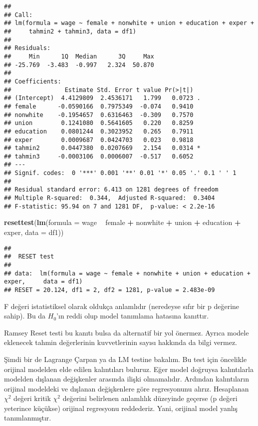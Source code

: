\documentclass[
]{book}
\newenvironment{Shaded}{\begin{snugshade}}{\end{snugshade}}
\newcommand{\DataTypeTok}[1]{\textcolor[rgb]{0.13,0.29,0.53}{#1}}
\newcommand{\KeywordTok}[1]{\textcolor[rgb]{0.13,0.29,0.53}{\textbf{#1}}}
\newcommand{\NormalTok}[1]{#1}
\newcommand{\OperatorTok}[1]{\textcolor[rgb]{0.81,0.36,0.00}{\textbf{#1}}}
\newcommand{\StringTok}[1]{\textcolor[rgb]{0.31,0.60,0.02}{#1}}
\begin{document}
\begin{verbatim}
## 
## Call:
## lm(formula = wage ~ female + nonwhite + union + education + exper + 
##     tahmin2 + tahmin3, data = df1)
## 
## Residuals:
##     Min      1Q  Median      3Q     Max 
## -25.769  -3.483  -0.997   2.324  50.870 
## 
## Coefficients:
##               Estimate Std. Error t value Pr(>|t|)  
## (Intercept)  4.4129809  2.4536171   1.799   0.0723 .
## female      -0.0590166  0.7975349  -0.074   0.9410  
## nonwhite    -0.1954657  0.6316463  -0.309   0.7570  
## union        0.1241080  0.5641605   0.220   0.8259  
## education    0.0801244  0.3023952   0.265   0.7911  
## exper        0.0009687  0.0424703   0.023   0.9818  
## tahmin2      0.0447380  0.0207669   2.154   0.0314 *
## tahmin3     -0.0003106  0.0006007  -0.517   0.6052  
## ---
## Signif. codes:  0 '***' 0.001 '**' 0.01 '*' 0.05 '.' 0.1 ' ' 1
## 
## Residual standard error: 6.413 on 1281 degrees of freedom
## Multiple R-squared:  0.344,  Adjusted R-squared:  0.3404 
## F-statistic: 95.94 on 7 and 1281 DF,  p-value: < 2.2e-16
\end{verbatim}

\begin{Shaded}
\begin{Highlighting}[]
\KeywordTok{resettest}\NormalTok{(}\KeywordTok{lm}\NormalTok{(}\DataTypeTok{formula =}\NormalTok{ wage }\OperatorTok{~}\StringTok{ }\NormalTok{female }\OperatorTok{+}\StringTok{ }\NormalTok{nonwhite }\OperatorTok{+}\StringTok{ }\NormalTok{union }\OperatorTok{+}\StringTok{ }\NormalTok{education }\OperatorTok{+}\StringTok{ }\NormalTok{exper, }\DataTypeTok{data =}\NormalTok{ df1))}
\end{Highlighting}
\end{Shaded}

\begin{verbatim}
## 
##  RESET test
## 
## data:  lm(formula = wage ~ female + nonwhite + union + education + exper,     data = df1)
## RESET = 20.124, df1 = 2, df2 = 1281, p-value = 2.483e-09
\end{verbatim}

F değeri istatistiksel olarak oldukça anlamlıdır (neredeyse sıfır bir p değerine sahip). Bu da \(H_0\)'ın reddi olup model tanımlama hatasına kanıttır.

Ramsey Reset testi bu kanıtı bulsa da alternatif bir yol önermez. Ayrıca modele eklenecek tahmin değerlerinin kuvvetlerinin sayısı hakkında da bilgi vermez.

Şimdi bir de Lagrange Çarpan ya da LM testine bakalım. Bu test için öncelikle orijinal modelden elde edilen kalıntıları buluruz. Eğer model doğruysa kalıntılarla modelden dışlanan değişkenler arasında ilişki olmamalıdır. Ardından kalıntıların orijinal modeldeki ve dışlanan değişkenlere göre regresyonunu alırız. Hesaplanan \(\chi^2\) değeri kritik \(\chi^2\) değerini belirlenen anlamlılık düzeyinde geçerse (p değeri yeterince küçükse) orijinal regresyonu reddederiz. Yani, orijinal model yanlış tanımlanmıştır.
\end{document}
